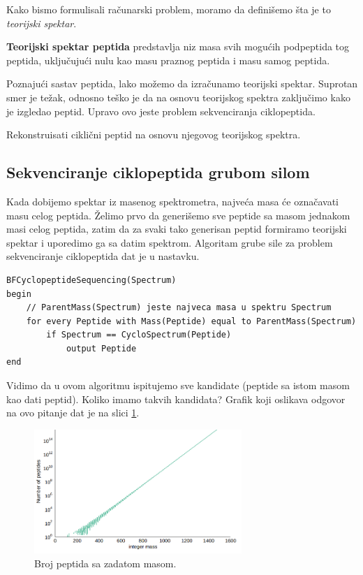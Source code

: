 Kako bismo formulisali računarski problem, moramo da definišemo šta je to \textit{teorijski spektar}. 
\begin{definicija} \textbf{Teorijski spektar peptida} predstavlja niz masa svih mogućih podpeptida tog peptida, uključujući nulu kao masu praznog peptida i masu samog peptida.
\end{definicija}

Poznajući sastav peptida, lako možemo da izračunamo teorijski spektar. Suprotan smer je težak, odnosno teško je da na osnovu teorijskog spektra zaključimo kako je izgledao peptid. Upravo ovo jeste problem sekvenciranja ciklopeptida.

\begin{problem} 
	Rekonstruisati ciklični peptid na osnovu njegovog teorijskog spektra. \\
\end{problem}



\subsection{Sekvenciranje ciklopeptida grubom silom}

Kada dobijemo spektar iz masenog spektrometra, najveća masa će označavati masu celog peptida. Želimo prvo da generišemo sve peptide sa masom jednakom masi celog peptida, zatim da za svaki tako generisan peptid formiramo teorijski spektar i uporedimo ga sa datim spektrom. Algoritam grube sile za problem sekvenciranje ciklopeptida dat je u nastavku. 

\begin{lstlisting}
BFCyclopeptideSequencing(Spectrum)
begin
	// ParentMass(Spectrum) jeste najveca masa u spektru Spectrum
	for every Peptide with Mass(Peptide) equal to ParentMass(Spectrum)
		if Spectrum == CycloSpectrum(Peptide)
			output Peptide
end
\end{lstlisting}

Vidimo da u ovom algoritmu ispitujemo sve kandidate (peptide sa istom masom kao dati peptid). Koliko imamo takvih kandidata? Grafik koji oslikava odgovor na ovo pitanje dat je na slici \ref{slika:kolikoPeptida}.

\begin{figure}[h!]
	\centering
	\includegraphics[width=0.7\textwidth]{poglavlja/4/slike/kolikoPeptida.png}
	\caption{Broj peptida sa zadatom masom.}
	\label{slika:kolikoPeptida}
\end{figure} 

